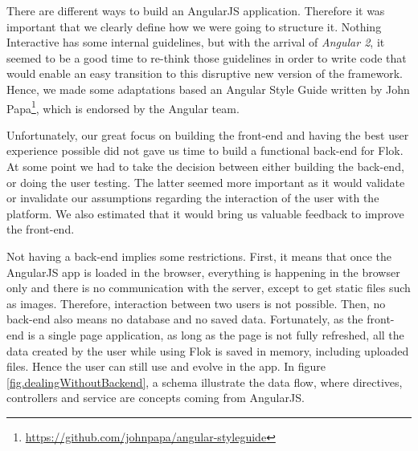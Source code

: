 \documentclass[a4paper,12pt,twoside]{article}
\begin{document}
There are different ways to build an AngularJS application.
Therefore it was important that we clearly define how we were going to structure it.
Nothing Interactive has some internal guidelines, but with the arrival of \emph{Angular 2}, it seemed to be a good time to re-think those guidelines in order to write code that would enable an easy transition to this disruptive new version of the framework.
Hence, we made some adaptations based an Angular Style Guide written by John Papa\footnote{\url{https://github.com/johnpapa/angular-styleguide}}, which is endorsed by the Angular team.

Unfortunately, our great focus on building the front-end and having the best user experience possible did not gave us time to build a functional back-end for Flok.
At some point we had to take the decision between either building the back-end, or doing the user testing.
The latter seemed more important as it would validate or invalidate our assumptions regarding the interaction of the user with the platform.
We also estimated that it would bring us valuable feedback to improve the front-end.

Not having a back-end implies some restrictions.
First, it means that once the AngularJS app is loaded in the browser, everything is happening in the browser only and there is no communication with the server, except to get static files such as images.
Therefore, interaction between two users is not possible.
Then, no back-end also means no database and no saved data.
Fortunately, as the front-end is a single page application, as long as the page is not fully refreshed, all the data created by the user while using Flok is saved in memory, including uploaded files.
Hence the user can still use and evolve in the app.
In figure \ref{fig.dealingWithoutBackend}, a schema illustrate the data flow, where directives, controllers and service are concepts coming from AngularJS.
\end{document}
